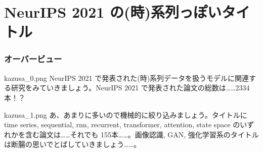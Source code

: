 \documentclass[b5paper,xelatex,ja=standard,10pt]{bxjsarticle}
\begin{document}


\part*{NeurIPS 2021 の(時)系列っぽいタイトル}

\begin{spacing}{0.9}
\tableofcontents
\end{spacing}


\vspace{3pt}

\section*{オーバービュー}
\vspace{3pt}

\begin{SERIFU}[colback=PaleIris]{kazusa_0.png}
NeurIPS 2021 で発表された(時)系列データを扱うモデルに関連する研究をみていきましょう。NeurIPS 2021 で発表された論文の総数は……2334本！？
\end{SERIFU}

\begin{SERIFU}[colback=PaleIris]{kazusa_1.png}
あ、あまりに多いので機械的に絞り込みましょう。タイトルに time series, sequential, rnn, recurrent, transformer, attention, state space のいずれかを含む論文は……それでも 155本……。画像認識, GAN, 強化学習系のタイトルは断腸の思いでとばしていきましょう……。
\end{SERIFU}
\end{document}
